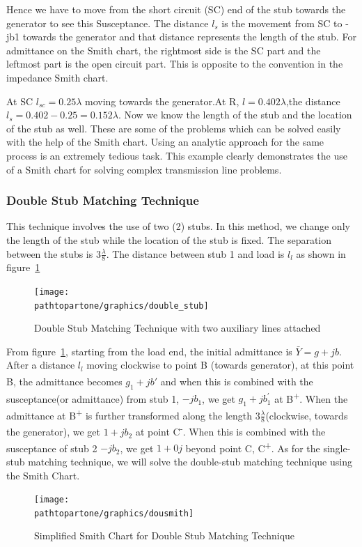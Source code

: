 \begin{exmp}
Hence we have to move from the short circuit (SC) end of the stub towards the generator to see this Susceptance. The distance $l_s$ is the movement from SC to -jb1 towards the generator and that distance represents the length of the stub. For admittance on the Smith chart, the rightmost side is the SC part and the leftmost part is the open circuit part. This is opposite to the convention in the impedance Smith chart.

At SC $l_{sc}=0.25\lambda$ moving towards the generator.At R, $l=0.402\lambda$,the distance $l_s=0.402-0.25=0.152\lambda$. Now we know the length of the stub and the location of the stub as well. These are some of the problems which can be solved easily with the help of the Smith chart. Using an analytic approach for the same process is an extremely tedious task. This example clearly demonstrates the use of a Smith chart for solving complex transmission line problems.
\end{exmp}

\subsubsection{Double Stub Matching Technique}
This technique involves the use of two (2) stubs. In this method, we change only the length of the stub while the location of the stub is fixed. The separation between the stubs is $3\frac{\lambda}{8}$. The distance between stub 1 and load is $l_l$ as shown in figure~\ref{fig:fig12}
\begin{figure}[h]
\centering
\texttt{[image: \\pathtopartone/graphics/double\_stub]}
\caption{Double Stub Matching Technique with two auxiliary lines attached}
\label{fig:fig12}
\end{figure}


From figure~\ref{fig:fig12}, starting from the load end, the initial admittance is $\bar{Y} = g + jb$. After a distance $l_l$ moving clockwise to point B (towards generator), at this point B\textsuperscript{\textemdash}, the admittance becomes $g_1 + jb'$ and when this is combined with the susceptance(or admittance) from stub 1, $-jb_1$, we get $g_1 +jb_1^{'}$ at B\textsuperscript{+}. When the admittance at B\textsuperscript{+} is further transformed along the length $3\frac{\lambda}{8}$(clockwise, towards the generator), we get $1 + jb_2$ at point C\textsuperscript{-}. When this is combined with the susceptance of stub 2 $-jb_2$, we get $1 + 0j$ beyond point C, C\textsuperscript{+}. As for the single-stub matching technique, we will solve the double-stub matching technique using the Smith Chart.
\begin{figure}[h]
\centering
\texttt{[image: \\pathtopartone/graphics/dousmith]}
\caption{Simplified Smith Chart for Double Stub Matching Technique}
\label{fig:dousmith}
\end{figure}

